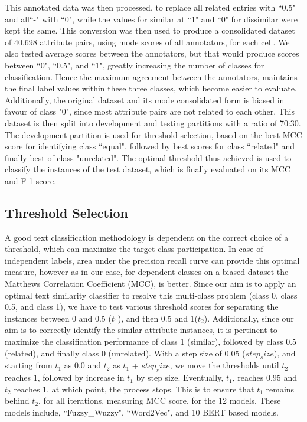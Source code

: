 \documentclass{ieeeaccess}
\begin{document}
This annotated data was then processed, to replace all related entries with ``0.5" and all``-" with ``0", while the values for similar at ``1" and ``0" for dissimilar were kept the same. This conversion was then used to produce a consolidated dataset of 40,698 attribute pairs, using mode scores of all annotators, for each cell. We also tested average scores between the annotators, but that would produce scores between ``0", ``0.5", and ``1", greatly increasing the number of classes for classification. Hence the maximum agreement between the annotators, maintains the final label values within these three classes, which become easier to evaluate. Additionally, the original dataset and its mode consolidated form is biased in favour of class "0", since most attribute pairs are not related to each other.
This dataset is then split into development and testing partitions with a ratio of 70:30. The development partition is used for threshold selection, based on the best MCC score for identifying class ``equal", followed by best scores for class ``related" and finally best of class "unrelated". The optimal threshold thus achieved is used to classify the instances of the test dataset, which is finally evaluated on its MCC and F-1 score.

\subsection{Threshold Selection}
A good text classification methodology is dependent on the correct choice of a threshold, which can maximize the target class participation. In case of independent labels, area under the precision recall curve can provide this optimal measure, however as in our case, for dependent classes on a biased dataset the Matthews Correlation Coefficient (MCC), is better\cite{chicco2020advantages}. Since our aim is to apply an optimal text similarity classifier to resolve this multi-class problem (class 0, class 0.5, and class 1), we have to test various threshold scores for separating the instances between 0 and 0.5 ($t_1$), and then 0.5 and 1($t_2$). Additionally, since our aim is to correctly identify the similar attribute instances, it is pertinent to maximize the classification performance of class 1 (similar), followed by class 0.5 (related), and finally class 0 (unrelated).
With a step size of 0.05 ($step_size$), and starting from $t_1$ as 0.0 and $t_2$ as $t_1$ + $step_size$, we move the thresholds until $t_2$ reaches 1, followed by increase in $t_1$ by step size. Eventually, $t_1$, reaches 0.95 and $t_2$ reaches 1, at which point, the process stops. This is to ensure that $t_1$ remains behind $t_2$, for all iterations, measuring MCC score, for the 12 models. These models include, ``Fuzzy\_Wuzzy", ``Word2Vec", and 10 BERT based models.
\end{document}
